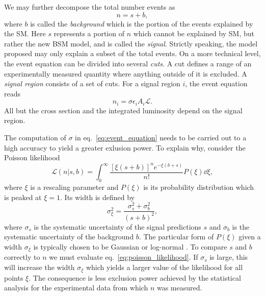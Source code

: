 We may further decompose the total number events as
\begin{equation}\label{eq:total_events_decomp}
    n = s + b,
\end{equation}
where $b$ is called the \textit{background} which is the portion of the events explained by the SM. Here $s$ represents a portion of $n$ which cannot be explained by SM, but rather the new BSM model, and is called the \textit{signal}. Strictly speaking, the model proposed may only explain a subset of the total events. 
On a more technical level, the event equation can be divided into several \textit{cuts}. A cut defines a range of an experimentally measured quantity where anything outside of it is excluded. A \textit{signal region} consists of a set of cuts. For a signal region $i$, the event equation reads
\begin{equation}\label{eq:general_event_eq}
    n_i = \sigma \epsilon_i A_i \mathcal{L}.
\end{equation} 
All but the cross section and the integrated luminosity depend on the signal region.

The computation of $\sigma$ in eq.~\eqref{eq:event_equation} needs to be carried out to a high accuracy to yield a greater exlusion power. To explain why, consider the Poisson likelihood
\begin{equation}\label{eq:poisson_likelihood}
    \mathcal{L}(n|s, b) = \int_0^\infty \frac{[\xi(s + b)]^n e^{-\xi(b + s)}}{n!}P(\xi)\dd \xi,
\end{equation}
where $\xi$ is a rescaling parameter and $P(\xi)$ is its probability distribution which is peaked at $\xi = 1$.
Its width is defined by
\begin{equation}\label{eq:xi_width}
    \sigma_\xi^2 = \frac{\sigma_s^2 + \sigma_b^2}{(s + b)^2},
\end{equation}
where $\sigma_s$ is the systematic uncertainty of the signal predictions $s$ and $\sigma_b$ is the systematic uncertainty of the background $b$. The particular form of $P(\xi)$ given a width $\sigma_\xi$ is typically chosen to be Gaussian or log-normal \cite{colliderbit}.
To compare $s$ and $b$ correctly to $n$ we must evaluate eq.~\eqref{eq:poisson_likelihood}. If $\sigma_s$ is large, this will increase the width $\sigma_\xi$ which yields a larger value of the likelihood for all points $\xi$. The consequence is less exclusion power achieved by the statistical analysis for the experimental data from which $n$ was measured.

